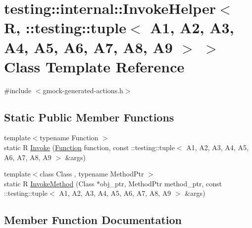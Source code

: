 \hypertarget{classtesting_1_1internal_1_1InvokeHelper_3_01R_00_01_1_1testing_1_1tuple_3_01A1_00_01A2_00_01A3_1c5f66c8b5e7674a520f1ea38507628c}{}\section{testing\+::internal\+::Invoke\+Helper$<$ R, \+::testing\+::tuple$<$ A1, A2, A3, A4, A5, A6, A7, A8, A9 $>$ $>$ Class Template Reference}
\label{classtesting_1_1internal_1_1InvokeHelper_3_01R_00_01_1_1testing_1_1tuple_3_01A1_00_01A2_00_01A3_1c5f66c8b5e7674a520f1ea38507628c}


{\ttfamily \#include $<$gmock-\/generated-\/actions.\+h$>$}

\subsection*{Static Public Member Functions}
\begin{DoxyCompactItemize}
\item 
{\footnotesize template$<$typename Function $>$ }\\static R \mbox{\hyperlink{classtesting_1_1internal_1_1InvokeHelper_3_01R_00_01_1_1testing_1_1tuple_3_01A1_00_01A2_00_01A3_1c5f66c8b5e7674a520f1ea38507628c_afd0d2a5a81d947b5b11dc2ede6e49a0e}{Invoke}} (\mbox{\hyperlink{structtesting_1_1internal_1_1Function}{Function}} function, const \+::testing\+::tuple$<$ A1, A2, A3, A4, A5, A6, A7, A8, A9 $>$ \&args)
\item 
{\footnotesize template$<$class Class , typename Method\+Ptr $>$ }\\static R \mbox{\hyperlink{classtesting_1_1internal_1_1InvokeHelper_3_01R_00_01_1_1testing_1_1tuple_3_01A1_00_01A2_00_01A3_1c5f66c8b5e7674a520f1ea38507628c_ab468cf4a3e1ff2fa33a60ce3459c17f7}{Invoke\+Method}} (Class $\ast$obj\+\_\+ptr, Method\+Ptr method\+\_\+ptr, const \+::testing\+::tuple$<$ A1, A2, A3, A4, A5, A6, A7, A8, A9 $>$ \&args)
\end{DoxyCompactItemize}


\subsection{Member Function Documentation}
\mbox{\label{classtesting_1_1internal_1_1InvokeHelper_3_01R_00_01_1_1testing_1_1tuple_3_01A1_00_01A2_00_01A3_1c5f66c8b5e7674a520f1ea38507628c_afd0d2a5a81d947b5b11dc2ede6e49a0e}} 
